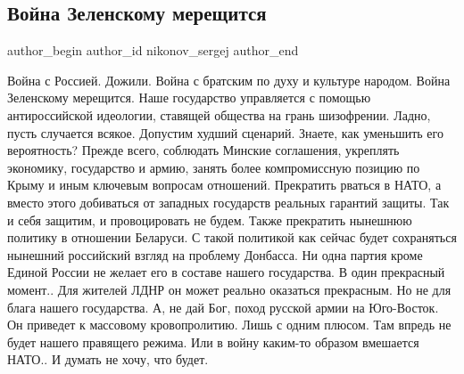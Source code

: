  
 
 
 
 
 
\subsection{Война Зеленскому мерещится}
\label{sec:12_09_2021.fb.nikonov_sergej.3.vojna_zelenskii_rossia}
 
\ifcmt
 author_begin
   author_id nikonov_sergej
 author_end
\fi

Война с Россией. Дожили. Война с братским по духу и культуре народом. Война
Зеленскому мерещится. Наше  государство управляется с помощью антироссийской
идеологии, ставящей общества на грань шизофрении. Ладно, пусть случается
всякое.  Допустим худший сценарий. Знаете, как уменьшить его вероятность?
Прежде всего, соблюдать Минские соглашения, укреплять экономику, государство и
армию, занять более компромиссную позицию по Крыму и иным ключевым вопросам
отношений. Прекратить рваться в НАТО, а вместо этого добиваться от западных
государств реальных гарантий защиты. Так и себя защитим, и провоцировать не
будем. Также прекратить нынешнюю политику в отношении Беларуси. С такой
политикой как сейчас будет сохраняться нынешний российский взгляд на проблему
Донбасса. Ни одна партия кроме Единой России не желает его в составе нашего
государства. В один прекрасный момент.. Для жителей ЛДНР он может реально
оказаться прекрасным. Но не для блага нашего государства. А, не дай Бог, поход
русской армии на Юго-Восток. Он приведет к массовому кровопролитию. Лишь с
одним плюсом. Там впредь не будет нашего правящего режима. Или в войну каким-то
образом вмешается НАТО.. И думать не хочу, что будет.

